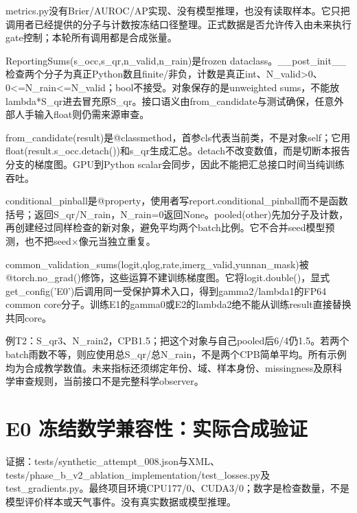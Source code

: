 \documentclass[UTF8,fontset=fandol,10pt]{ctexart}
\begin{document}
metrics.py没有Brier/\allowbreak{}AUROC/\allowbreak{}AP实现、没有模型推理，也没有读取样本。它只把调用者已经提供的分子与计数按冻结口径整理。正式数据是否允许传入由未来执行gate控制；本轮所有调用都是合成张量。

ReportingSums(s\_\allowbreak{}occ,s\_\allowbreak{}qr,n\_\allowbreak{}valid,n\_\allowbreak{}rain)是frozen dataclass。\_\allowbreak{}\_\allowbreak{}post\_\allowbreak{}init\_\allowbreak{}\_\allowbreak{}检查两个分子为真正Python数且finite/\allowbreak{}非负，计数是真正int、N\_\allowbreak{}valid>0、0<=N\_\allowbreak{}rain<=N\_\allowbreak{}valid；bool不接受。对象保存的是unweighted sums，不能放lambda*S\_\allowbreak{}qr进去冒充原S\_\allowbreak{}qr。接口语义由from\_\allowbreak{}candidate与测试确保，任意外部人手输入float则仍需来源审查。

from\_\allowbreak{}candidate(result)是@classmethod，首参cls代表当前类，不是对象self；它用float(result.s\_\allowbreak{}occ.detach())和s\_\allowbreak{}qr生成汇总。detach不改变数值，而是切断本报告分支的梯度图。GPU到Python scalar会同步，因此不能把汇总接口时间当纯训练吞吐。

conditional\_\allowbreak{}pinball是@property，使用者写report.conditional\_\allowbreak{}pinball而不是函数括号；返回S\_\allowbreak{}qr/\allowbreak{}N\_\allowbreak{}rain，N\_\allowbreak{}rain=0返回None。pooled(other)先加分子及计数，再创建经过同样检查的新对象，避免平均两个batch比例。它不合并seed模型预测，也不把seed\(\times\)像元当独立重复。

common\_\allowbreak{}validation\_\allowbreak{}sums(logit,qlog,rate,imerg\_\allowbreak{}valid,yunnan\_\allowbreak{}mask)被@torch.no\_\allowbreak{}grad()修饰，这些运算不建训练梯度图。它将logit.double()，显式get\_\allowbreak{}config('E0')后调用同一受保护算术入口，得到gamma2/\allowbreak{}lambda1的FP64 common core分子。训练E1的gamma0或E2的lambda2绝不能从训练result直接替换共同core。

例T2：S\_\allowbreak{}qr3、N\_\allowbreak{}rain2，CPB1.5；把这个对象与自己pooled后6/\allowbreak{}4仍1.5。若两个batch雨数不等，则应使用总S\_\allowbreak{}qr/\allowbreak{}总N\_\allowbreak{}rain，不是两个CPB简单平均。所有示例均为合成教学数值。未来指标还须绑定年份、域、样本身份、missingness及原科学审查规则，当前接口不是完整科学observer。
\clearpage\section{E0 冻结数学兼容性：实际合成验证}

证据：tests/\allowbreak{}synthetic\_\allowbreak{}attempt\_\allowbreak{}008.json与XML、tests/\allowbreak{}phase\_\allowbreak{}b\_\allowbreak{}v2\_\allowbreak{}ablation\_\allowbreak{}implementation/\allowbreak{}test\_\allowbreak{}losses.py及test\_\allowbreak{}gradients.py。最终项目环境CPU177/\allowbreak{}0、CUDA3/\allowbreak{}0；数字是检查数量，不是模型评价样本或天气事件。没有真实数据或模型推理。
\end{document}
